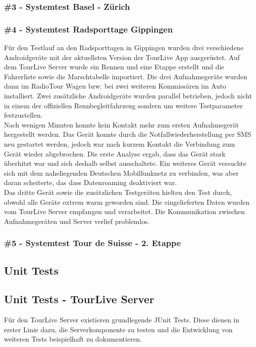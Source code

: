 \subsubsection{\#3 - Systemtest Basel - Zürich}


\subsubsection{\#4 - Systemtest Radsporttage Gippingen}
\label{sec:testberichtgippingen}
Für den Testlauf an den Radsporttagen in Gippingen wurden drei verschiedene Androidgeräte mit der aktuellsten Version der TourLive App ausgerüstet. Auf dem TourLive Server wurde ein Rennen und eine Etappe erstellt und die Fahrerliste sowie die Marschtabelle importiert. Die drei Aufnahmegeräte wurden dann im RadioTour Wagen bzw. bei zwei weiteren Kommissären im Auto installiert. Zwei zusätzliche Androidgeräte wurden parallel betrieben, jedoch nicht in einem der offiziellen Rennbegleitfahrzeug sondern um weitere Testparameter festzustellen.
\\

Nach wenigen Minuten konnte kein Kontakt mehr zum ersten Aufnahmegerät hergestellt werden. Das Gerät konnte durch die Notfallwiederherstellung per SMS neu gestartet werden, jedoch war nach kurzem Kontakt die Verbindung zum Gerät wieder abgebrochen. Die erste Analyse ergab, dass das Gerät stark überhitzt war und sich deshalb selbst ausschaltete. Ein weiteres Gerät versuchte sich mit dem naheliegenden Deutschen Mobilfunknetz zu verbinden, was aber daran scheiterte, das dass Datenroaming deaktiviert war.
\\

Das dritte Gerät sowie die zusätzlichen Testgeräten hielten den Test durch, obwohl alle Geräte extrem warm geworden sind. Die eingelieferten Daten wurden vom TourLive Server empfangen und verarbeitet. Die Kommunikation zwischen Aufnahmegeräten und Server verlief problemlos.

\subsubsection{\#5 - Systemtest Tour de Suisse - 2. Etappe}


\subsection{Unit Tests}
\label{sec:unittests}
\subsection{Unit Tests - TourLive Server}
Für den TourLive Server existieren grundlegende JUnit Tests. Diese dienen in erster Linie dazu, die Serverkomponente zu testen und die Entwicklung von weiteren Tests beispielhaft zu dokumentieren.